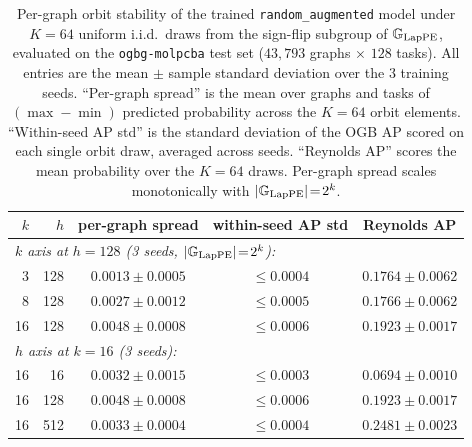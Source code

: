 \begin{table}[h]
\centering
\caption{Per-graph orbit stability of the trained
\texttt{random\_augmented} model under $K\!=\!64$ uniform i.i.d.\
draws from the sign-flip subgroup of $\mathbb{G}_{\mathrm{LapPE}}$, evaluated
on the \texttt{ogbg-molpcba} test set ($43{,}793$ graphs $\times$
$128$ tasks). All entries are the mean $\pm$ sample standard deviation
over the $3$ training seeds. ``Per-graph spread'' is the mean over
graphs and tasks of $(\max\!-\!\min)$ predicted probability across
the $K\!=\!64$ orbit elements. ``Within-seed AP std'' is the standard
deviation of the OGB AP scored on each single orbit draw, averaged
across seeds. ``Reynolds AP'' scores the mean probability over the
$K\!=\!64$ draws. Per-graph spread scales monotonically with
$|\mathbb{G}_{\mathrm{LapPE}}|\!=\!2^{k}$.}
\label{tab:lpe_molpcba_orbit}
\begin{tabular}{rrccc}
\toprule
$k$ & $h$ & per-graph spread & within-seed AP std & Reynolds AP \\
\midrule
\multicolumn{5}{l}{\emph{$k$ axis at $h\!=\!128$ (3 seeds, $|\mathbb{G}_{\mathrm{LapPE}}|\!=\!2^{k}$):}} \\
 3  & 128 & $0.0013 \pm 0.0005$ & $\le 0.0004$ & $0.1764 \pm 0.0062$ \\
 8  & 128 & $0.0027 \pm 0.0012$ & $\le 0.0005$ & $0.1766 \pm 0.0062$ \\
16  & 128 & $0.0048 \pm 0.0008$ & $\le 0.0006$ & $0.1923 \pm 0.0017$ \\
\midrule
\multicolumn{5}{l}{\emph{$h$ axis at $k\!=\!16$ (3 seeds):}} \\
16  &  16 & $0.0032 \pm 0.0015$ & $\le 0.0003$ & $0.0694 \pm 0.0010$ \\
16  & 128 & $0.0048 \pm 0.0008$ & $\le 0.0006$ & $0.1923 \pm 0.0017$ \\
16  & 512 & $0.0033 \pm 0.0004$ & $\le 0.0004$ & $0.2481 \pm 0.0023$ \\
\bottomrule
\end{tabular}
\end{table}

